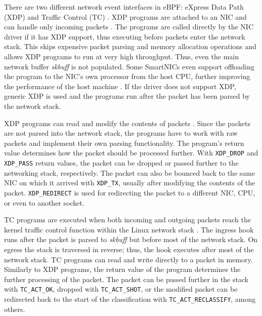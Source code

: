 \documentclass[english, 12pt, a4paper, sci, utf8, a-2b, online]{aaltothesis}
\newcommand{\mycomment}[3]{\textcolor{#1}{#2:~#3}}
\newcommand{\jb}[1]{\noindent\mycomment{aaltoRed}{JB}{#1}}
\begin{document}
There are two different network event interfaces in eBPF: eXpress Data Path (XDP) and Traffic Control (TC) \cite{miano2021framework}.
XDP programs are attached to an NIC and can handle only incoming packets \cite{hoiland2018express}.
The programs are called directly by the NIC driver if it has XDP support, thus executing before packets enter the network stack.
This skips expensive packet parsing and memory allocation operations and allows XDP programs to run at very high throughput.
Thus, even the main network buffer \emph{skbuff} is not populated.
Some SmartNICs even support offloading the program to the NIC's own processor from the host CPU, further improving the performance of the host machine \cite{cilium-program-types}.
If the driver does not support XDP, generic XDP is used and the programs run after the packet has been parsed by the network stack.

XDP programs can read and modify the contents of packets \cite{vieira2020fast}.
Since the packets are not parsed into the network stack, the programs have to work with raw packets and implement their own parsing functionality.
The program's return value determines how the packet should be processed further.
With \lstinline{XDP_DROP} and \lstinline{XDP_PASS} return values, the packet can be dropped or passed further to the networking stack, respectively.
The packet can also be bounced back to the same NIC on which it arrived with \lstinline{XDP_TX}, usually after modifying the contents of the packet.
\lstinline{XDP_REDIRECT} is used for redirecting the packet to a different NIC, CPU, or even to another socket.

TC programs are executed when both incoming and outgoing packets reach the kernel traffic control function within the Linux network stack \cite{vieira2020fast}.
The ingress hook runs after the packet is parsed to \emph{skbuff} but before most of the network stack.
On egress the stack is traversed in reverse; thus, the hook executes after most of the network stack.
TC programs can read and write directly to a packet in memory.
Similarly to XDP programs, the return value of the program determines the further processing of the packet.
The packet can be passed further in the stack with \lstinline{TC_ACT_OK}, dropped with \lstinline{TC_ACT_SHOT}, or the modified packet can be redirected back to the start of the classification with \lstinline{TC_ACT_RECLASSIFY}, among others.

\clearpage
\end{document}
